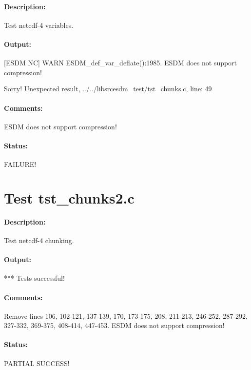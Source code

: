 \paragraph{Description:} Test netcdf-4 variables.

\paragraph{Output:} [ESDM NC] WARN ESDM\_def\_var\_deflate():1985. ESDM does not support compression!

Sorry! Unexpected result, ../../libsrcesdm\_test/tst\_chunks.c, line: 49

\paragraph{Comments:} ESDM does not support compression!

\paragraph{Status:} FAILURE!

\section{Test tst\_chunks2.c}

\paragraph{Description:} Test netcdf-4 chunking.

\paragraph{Output:} *** Tests successful!

\paragraph{Comments:} Remove lines 106, 102-121, 137-139, 170, 173-175, 208, 211-213, 246-252, 287-292, 327-332, 369-375, 408-414, 447-453. ESDM does not support compression!

\paragraph{Status:} PARTIAL SUCCESS!

\section{{\color{blue}{FIX ME! Test tst\_chunks3.c}}}


